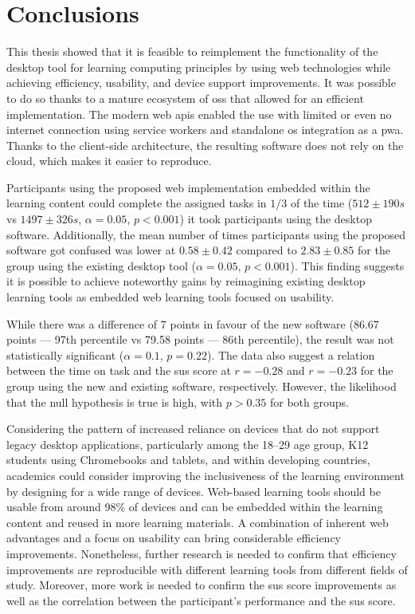 \chapter{Conclusions}
\label{Conclusions}

This thesis showed that it is feasible to reimplement the functionality of the desktop tool for learning computing principles by using web technologies while achieving efficiency, usability, and device support improvements.
It was possible to do so thanks to a mature ecosystem of \gls{oss} that allowed for an efficient implementation.
The modern web \glspl{api} enabled the use with limited or even no internet connection using service workers and standalone \gls{os} integration as a \gls{pwa}.
Thanks to the client-side architecture, the resulting software does not rely on the cloud, which makes it easier to reproduce.

Participants using the proposed web implementation embedded within the learning content could complete the assigned tasks in $1/3$ of the time ($512 \pm190 s$ vs $1497 \pm326 s$, $\alpha=0.05$, $p<0.001$) it took participants using the desktop software.
Additionally, the mean number of times participants using the proposed software got confused was lower at $0.58 \pm 0.42$ compared to $2.83 \pm 0.85$ for the group using the existing desktop tool ($\alpha=0.05$, $p<0.001$).
This finding suggests it is possible to achieve noteworthy gains by reimagining existing desktop learning tools as embedded web learning tools focused on usability.

While there was a difference of 7 points in favour of the new software (86.67 points --- 97th percentile vs 79.58 points --- 86th percentile), the result was not statistically significant ($\alpha=0.1$, $p=0.22$).
The data also suggest a relation between the time on task and the \gls{sus} score at $r=-0.28$ and $r=-0.23$ for the group using the new and existing software, respectively.
However, the likelihood that the null hypothesis is true is high, with $p > 0.35$ for both groups.

Considering the pattern of increased reliance on devices that do not support legacy desktop applications, particularly among the 18--29 age group, K12 students using Chromebooks and tablets, and within developing countries, academics could consider improving the inclusiveness of the learning environment by designing for a wide range of devices.
Web-based learning tools should be usable from around 98\% of devices and can be embedded within the learning content and reused in more learning materials.
A combination of inherent web advantages and a focus on usability can bring considerable efficiency improvements.
Nonetheless, further research is needed to confirm that efficiency improvements are reproducible with different learning tools from different fields of study.
Moreover, more work is needed to confirm the \gls{sus} score improvements as well as the correlation between the participant's performance and the \gls{sus} score.
